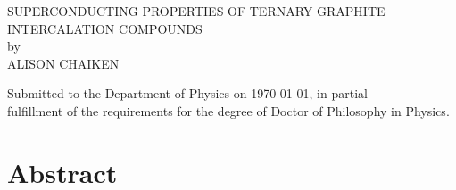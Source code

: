 \begin{center}
\begin{large}
SUPERCONDUCTING PROPERTIES OF TERNARY GRAPHITE INTERCALATION COMPOUNDS\\
\medskip
by\\
\medskip
ALISON CHAIKEN\\
\end{large}
\end{center}

\noindent Submitted to the Department of Physics on \today, in partial\\
fulfillment of the requirements for  the degree of Doctor  of Philosophy in
Physics.\\

\section*{Abstract}
\label{abstract}

